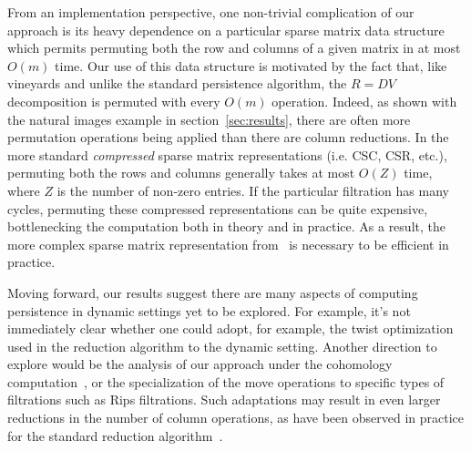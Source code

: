 \documentclass{article} %
\begin{document}
From an implementation perspective, one non-trivial complication of our approach is its heavy dependence on a particular sparse matrix data structure which permits permuting both the row and columns of a given matrix in at most $O(m)$ time. Our use of this data structure is motivated by the fact that, like vineyards and unlike the standard persistence algorithm, the $R = DV$ decomposition is permuted with every $O(m)$ operation. Indeed, as shown with the natural images example in section~\ref{sec:results}, there are often more permutation operations being applied than there are column reductions. In the more standard \emph{compressed} sparse matrix representations (i.e. CSC, CSR, etc.), permuting both the rows and columns generally takes at most $O(Z)$ time, where $Z$ is the number of non-zero entries. If the particular filtration has many cycles, permuting these compressed representations can be quite expensive, bottlenecking the computation both in theory and in practice. As a result, the more complex sparse matrix representation from~\cite{cohen2006vines} is necessary to be efficient in practice. 

Moving forward, our results suggest there are many aspects of computing persistence in dynamic settings yet to be explored. For example, it's not immediately clear whether one could adopt, for example, the twist optimization~\cite{chen2011persistent} used in the reduction algorithm to the dynamic setting. Another direction to explore would be the analysis of our approach under the cohomology computation~\cite{de2011dualities}, or the specialization of the move operations to specific types of filtrations such as Rips filtrations. Such adaptations may result in even larger reductions in the number of column operations, as have been observed in practice for the standard reduction algorithm~\cite{bauer2021ripser}. 
\end{document}

